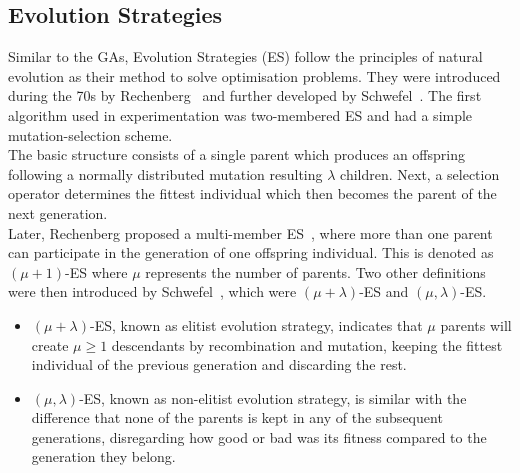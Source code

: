\subsection{Evolution Strategies}

Similar to the GAs, Evolution Strategies (ES) follow the principles of natural evolution as their method to solve optimisation problems. They were introduced during the 70s by Rechenberg~\cite{huning1976evolutionsstrategie} and further developed by Schwefel~\cite{back1991survey}. The first algorithm used in experimentation was two-membered ES and had a simple mutation-selection scheme.\\

The basic structure consists of a single parent which produces an offspring following a normally distributed mutation resulting $\lambda$ children. Next, a selection operator determines the fittest individual which then becomes the parent of the next generation.\\


Later, Rechenberg proposed a multi-member ES~\cite{huning1976evolutionsstrategie}, where more than one parent can participate in the generation of one offspring individual. This is denoted as $(\mu + 1)$-ES where $\mu$ represents the number of parents. Two other definitions were then introduced by Schwefel~\cite{reynolds2003effects}, which were $(\mu + \lambda)$-ES and $(\mu, \lambda)$-ES.\\

\begin{itemize}
    \item $(\mu + \lambda)$-ES, known as elitist evolution strategy, indicates that $\mu$ parents will create $\mu \geq 1$ descendants by recombination and mutation, keeping the fittest individual of the previous generation and discarding the rest.
    \item $(\mu, \lambda)$-ES, known as non-elitist evolution strategy, is similar with the difference that none of the parents is kept in any of the subsequent generations, disregarding how good or bad was its fitness compared to the generation they belong.
\end{itemize}\\

